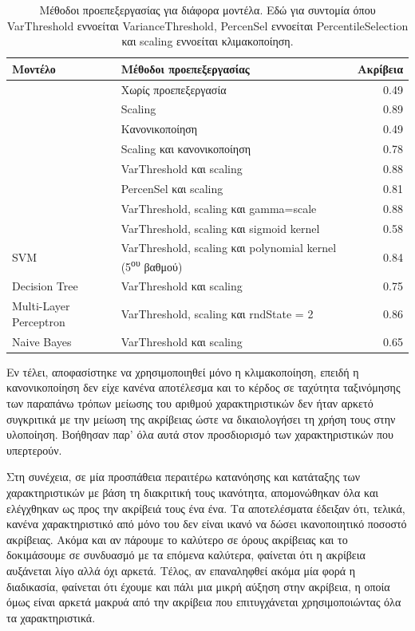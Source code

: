 \begin{table}[H]
	\centering
	\begin{tabular}{@{} l l r @{}}
		\toprule
		\textbf{Μοντέλο} & \textbf{Μέθοδοι προεπεξεργασίας} & \textbf{Ακρίβεια} \\ \midrule
		 & Χωρίς προεπεξεργασία & 0.49 \\
		 & Scaling & 0.89 \\
		 & Κανονικοποίηση & 0.49 \\
		 & Scaling και κανονικοποίηση & 0.78 \\
		 & VarThreshold και scaling & 0.88 \\
		 & PercenSel και scaling & 0.81 \\
		 & VarThreshold, scaling και gamma=scale & 0.88 \\
		 & VarThreshold, scaling και sigmoid kernel & 0.58 \\
		\multirow{-9}{*}{SVM} & VarThreshold,  scaling και polynomial kernel (5\textsuperscript{ου} βαθμού) & 0.84 \\ \midrule
		Decision Tree & VarThreshold και scaling & 0.75 \\ \midrule
		Multi-Layer Perceptron & VarThreshold, scaling και rndState = 2 & 0.86 \\ \midrule
		Naive Bayes & VarThreshold και scaling & 0.65 \\ \bottomrule
	\end{tabular}
	\caption{Μέθοδοι προεπεξεργασίας για διάφορα μοντέλα. \small
	Εδώ για συντομία όπου VarThreshold εννοείται VarianceThreshold, PercenSel εννοείται PercentileSelection και scaling εννοείται κλιμακοποίηση.}
	\label{table:tab}
\end{table}

Εν τέλει, αποφασίστηκε να χρησιμοποιηθεί μόνο η κλιμακοποίηση, επειδή η κανονικοποίηση δεν είχε κανένα αποτέλεσμα και το κέρδος σε ταχύτητα ταξινόμησης των παραπάνω τρόπων μείωσης του αριθμού χαρακτηριστικών δεν ήταν αρκετό συγκριτικά με την μείωση της ακρίβειας ώστε να δικαιολογήσει τη χρήση τους στην υλοποίηση. Βοήθησαν παρ' όλα αυτά στον προσδιορισμό των χαρακτηριστικών που υπερτερούν.

Στη συνέχεια, σε μία προσπάθεια περαιτέρω κατανόησης και κατάταξης των χαρακτηριστικών με βάση τη διακριτική τους ικανότητα, απομονώθηκαν όλα και ελέγχθηκαν ως προς την ακρίβειά τους ένα ένα. Τα αποτελέσματα έδειξαν ότι, τελικά, κανένα χαρακτηριστικό από μόνο του δεν είναι ικανό να δώσει ικανοποιητικό ποσοστό ακρίβειας. Ακόμα και αν πάρουμε το καλύτερο σε όρους ακρίβειας και το δοκιμάσουμε σε συνδυασμό με τα επόμενα καλύτερα, φαίνεται ότι η ακρίβεια αυξάνεται λίγο αλλά όχι αρκετά. Τέλος, αν επαναληφθεί ακόμα μία φορά η διαδικασία, φαίνεται ότι έχουμε και πάλι μια μικρή αύξηση στην ακρίβεια, η οποία όμως είναι αρκετά μακρυά από την ακρίβεια που επιτυγχάνεται χρησιμοποιώντας όλα τα χαρακτηριστικά.

